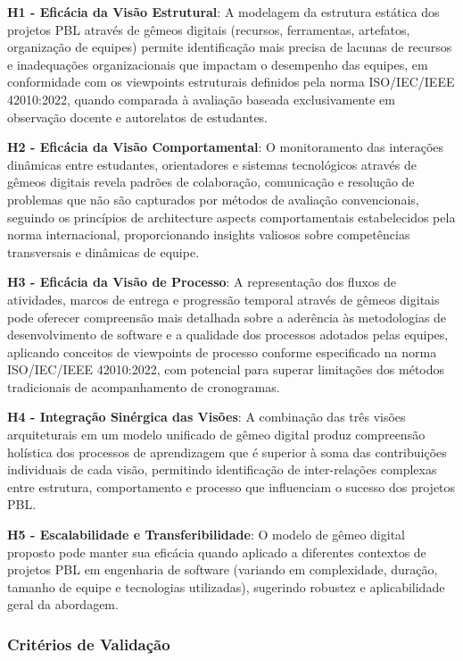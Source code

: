 \documentclass[12pt,a4paper]{article}
\begin{document}
\textbf{H1 - Eficácia da Visão Estrutural}: A modelagem da estrutura estática dos projetos PBL através de gêmeos digitais (recursos, ferramentas, artefatos, organização de equipes) permite identificação mais precisa de lacunas de recursos e inadequações organizacionais que impactam o desempenho das equipes, em conformidade com os viewpoints estruturais definidos pela norma ISO/IEC/IEEE 42010:2022, quando comparada à avaliação baseada exclusivamente em observação docente e autorelatos de estudantes.

\textbf{H2 - Eficácia da Visão Comportamental}: O monitoramento das interações dinâmicas entre estudantes, orientadores e sistemas tecnológicos através de gêmeos digitais revela padrões de colaboração, comunicação e resolução de problemas que não são capturados por métodos de avaliação convencionais, seguindo os princípios de architecture aspects comportamentais estabelecidos pela norma internacional, proporcionando insights valiosos sobre competências transversais e dinâmicas de equipe.

\textbf{H3 - Eficácia da Visão de Processo}: A representação dos fluxos de atividades, marcos de entrega e progressão temporal através de gêmeos digitais pode oferecer compreensão mais detalhada sobre a aderência às metodologias de desenvolvimento de software e a qualidade dos processos adotados pelas equipes, aplicando conceitos de viewpoints de processo conforme especificado na norma ISO/IEC/IEEE 42010:2022, com potencial para superar limitações dos métodos tradicionais de acompanhamento de cronogramas.

\textbf{H4 - Integração Sinérgica das Visões}: A combinação das três visões arquiteturais em um modelo unificado de gêmeo digital produz compreensão holística dos processos de aprendizagem que é superior à soma das contribuições individuais de cada visão, permitindo identificação de inter-relações complexas entre estrutura, comportamento e processo que influenciam o sucesso dos projetos PBL.

\textbf{H5 - Escalabilidade e Transferibilidade}: O modelo de gêmeo digital proposto pode manter sua eficácia quando aplicado a diferentes contextos de projetos PBL em engenharia de software (variando em complexidade, duração, tamanho de equipe e tecnologias utilizadas), sugerindo robustez e aplicabilidade geral da abordagem.

\subsubsection{Critérios de Validação}
\end{document}
